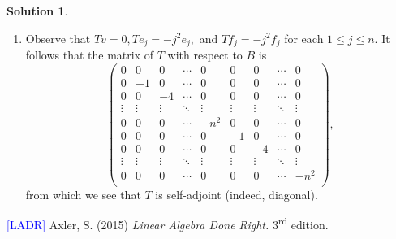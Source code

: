 \documentclass[12pt]{article}
\theoremstyle{definition}
\theoremstyle{exercise}
\theoremstyle{solution}
\newtheorem*{solution}{Solution}
\newcommand{\ts}{\textsuperscript}
\begin{document}
\begin{solution}
\begin{enumerate}
        \item Observe that \( Tv = 0, Te_j = -j^2 e_j, \) and \( Tf_j = -j^2 f_j \) for each \( 1 \leq j \leq n \). It follows that the matrix of \( T \) with respect to \( B \) is
        \[
            \begin{pmatrix}
                0 & 0 & 0 & \cdots & 0 & 0 & 0 & \cdots & 0 \\
                0 & -1 & 0 & \cdots & 0 & 0 & 0 & \cdots & 0 \\
                0 & 0 & -4 & \cdots & 0 & 0 & 0 & \cdots & 0 \\
                \vdots & \vdots & \vdots & \ddots & \vdots & \vdots & \vdots & \ddots & \vdots \\
                0 & 0 & 0 & \cdots & -n^2 & 0 & 0 & \cdots & 0 \\
                0 & 0 & 0 & \cdots & 0 & -1 & 0 & \cdots & 0 \\
                0 & 0 & 0 & \cdots & 0 & 0 & -4 & \cdots & 0 \\
                \vdots & \vdots & \vdots & \ddots & \vdots & \vdots & \vdots & \ddots & \vdots \\
                0 & 0 & 0 & \cdots & 0 & 0 & 0 & \cdots & -n^2 \\
            \end{pmatrix},
        \]
        from which we see that \( T \) is self-adjoint (indeed, diagonal).
    \end{enumerate}
\end{solution}

\noindent \hrulefill

\noindent \hypertarget{ladr}{\textcolor{blue}{[LADR]} Axler, S. (2015) \textit{Linear Algebra Done Right.} 3\ts{rd} edition.}
\end{document}
